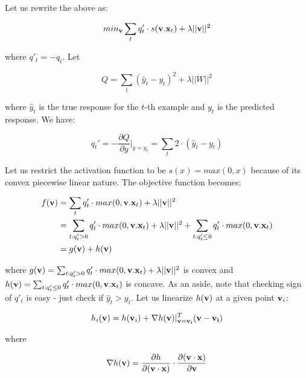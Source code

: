 \documentclass{article}
\begin{document}
Let us rewrite the above as:

\begin{equation}
min_{{\bf v}} \sum_{t} q'_t \cdot s({\bf v}.{\bf x}_t) + \lambda ||{\bf v}||^2
\end{equation}

where $q'_t = -q_t$. Let

\begin{equation}
Q = \sum_t (\hat{y}_t - y_t)^2 + \lambda ||W||^2
\end{equation}

where $\hat{y}_t$ is the true response for the $t$-th example and $y_t$ is the predicted response. We have:

\begin{equation}
q_t' =  - \frac{\partial Q}{\partial y}|_{y = y_t} = \sum_t 2 \cdot (\hat{y}_t - y_t)
\end{equation}

Let us restrict the activation function to be $s(x) = max(0, x)$ because of its convex piecewise linear nature. The objective function becomes:

\begin{align}
f({\bf v}) &= \sum_{t} q'_t \cdot max(0, {\bf v}.{\bf x}_t) + \lambda ||{\bf v}||^2 \\
&= \sum_{t: q'_t > 0} q'_t \cdot max(0, {\bf v}.{\bf x}_t) + \lambda ||{\bf v}||^2 +  \sum_{t: q'_t \leq 0} q'_t \cdot max(0, {\bf v}.{\bf x}_t) \\
&= g({\bf v}) + h({\bf v})
\end{align}

where $g({\bf v}) = \sum_{t: q'_t > 0} q'_t \cdot max(0, {\bf v}.{\bf x}_t) + \lambda ||{\bf v}||^2 $ is convex and $h({\bf v}) = \sum_{t: q'_t \leq 0} q'_t \cdot max(0, {\bf v}.{\bf x}_t)$ is concave. As an aside, note that checking sign of $q'_t$ is easy - just check if $\hat{y}_t > y_t$. Let us linearize $h({\bf v})$ at a given point ${\bf v}_i$:

\begin{align}
h_i({\bf v})= h({\bf v}_i) + \nabla h({\bf v})|_{\bf v = v_i}^T ({\bf v} - {\bf v_i})
\end{align}

where

\begin{align}
\nabla h({\bf v}) &= \frac{\partial h}{\partial {\bf (v\cdot x)}} \cdot \frac{\partial{\bf (v\cdot x)}}{\partial {\bf v}} \\
\end{align}
\end{document}

